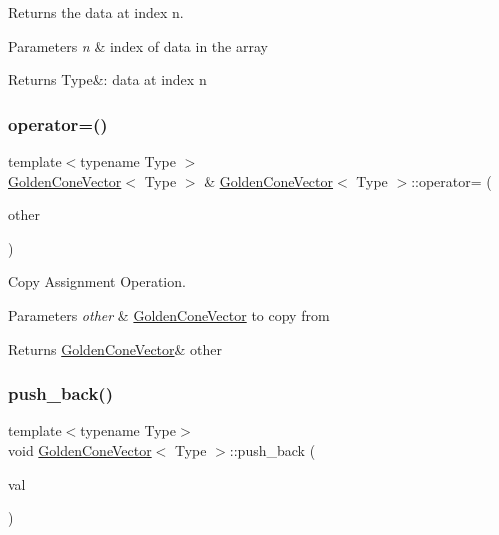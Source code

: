 Returns the data at index n. 


\begin{DoxyParams}{Parameters}
{\em n} & index of data in the array \\
\hline
\end{DoxyParams}
\begin{DoxyReturn}{Returns}
Type\&\+: data at index n 
\end{DoxyReturn}
\mbox{\label{class_golden_cone_vector_adc4c5b8ee0c9b005737c5a01047266cc}} 
\subsubsection{\texorpdfstring{operator=()}{operator=()}}
{\footnotesize\ttfamily template$<$typename Type $>$ \\
\mbox{\hyperlink{class_golden_cone_vector}{Golden\+Cone\+Vector}}$<$ Type $>$ \& \mbox{\hyperlink{class_golden_cone_vector}{Golden\+Cone\+Vector}}$<$ Type $>$\+::operator= (\begin{DoxyParamCaption}\item[{const \mbox{\hyperlink{class_golden_cone_vector}{Golden\+Cone\+Vector}}$<$ Type $>$ \&}]{other }\end{DoxyParamCaption})}



Copy Assignment Operation. 


\begin{DoxyParams}{Parameters}
{\em other} & \mbox{\hyperlink{class_golden_cone_vector}{Golden\+Cone\+Vector}} to copy from \\
\hline
\end{DoxyParams}
\begin{DoxyReturn}{Returns}
\mbox{\hyperlink{class_golden_cone_vector}{Golden\+Cone\+Vector}}\& other 
\end{DoxyReturn}
\mbox{\label{class_golden_cone_vector_ae86125397203f720c7f7a58822363919}} 
\subsubsection{\texorpdfstring{push\_back()}{push\_back()}}
{\footnotesize\ttfamily template$<$typename Type$>$ \\
void \mbox{\hyperlink{class_golden_cone_vector}{Golden\+Cone\+Vector}}$<$ Type $>$\+::push\+\_\+back (\begin{DoxyParamCaption}\item[{Type}]{val }\end{DoxyParamCaption})}



